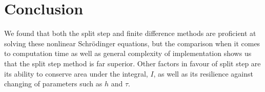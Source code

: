 \documentclass[12pt]{article}
\numberwithin{equation}{section}
\numberwithin{figure}{section}
\numberwithin{table}{section}
\begin{document}
\section{Conclusion}\label{sec:Conclusion}
We found that both the split step and finite difference methods are proficient at solving these nonlinear Schr\"odinger equations, but the comparison when it comes to computation time as well as general complexity of implementation shows us that the split step method is far superior. Other factors in favour of split step are its ability to conserve area under the integral, $I$, as well as its resilience against changing of parameters such as $h$ and $\tau$. 
\end{document}

